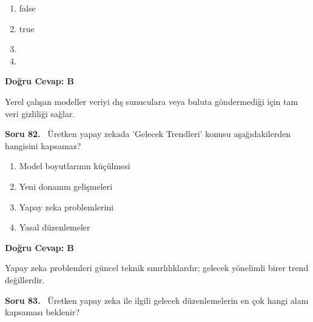 \documentclass[11pt,a4paper,openany]{book}
\begin{document}
\begin{enumerate}[label=\Alph*), leftmargin=25pt, topsep=4pt, itemsep=2pt]
        \item false
        \item true
        \item 
        \item 
\end{enumerate}

\vspace{4pt}
\begin{tcolorbox}[title=Cevap ve Açıklama, colback=gray!3!white, colframe=primarycolor!90!black, arc=2mm, fonttitle=\bfseries\sffamily, top=6pt, bottom=6pt]
    \textbf{Doğru Cevap: B}

    \vspace{2pt}
    Yerel çalışan modeller veriyi dış sunuculara veya buluta göndermediği için tam veri gizliliği sağlar.
\end{tcolorbox}
\vspace{10pt}
\needspace{5cm}
\vspace{8pt}
\noindent\textbf{\large\sffamily Soru 82.} \ Üretken yapay zekada 'Gelecek Trendleri' konusu aşağıdakilerden hangisini kapsamaz?

\begin{enumerate}[label=\Alph*), leftmargin=25pt, topsep=4pt, itemsep=2pt]
        \item Model boyutlarının küçülmesi
        \item Yeni donanım gelişmeleri
        \item Yapay zeka problemlerini
        \item Yasal düzenlemeler
\end{enumerate}

\vspace{4pt}
\begin{tcolorbox}[title=Cevap ve Açıklama, colback=gray!3!white, colframe=primarycolor!90!black, arc=2mm, fonttitle=\bfseries\sffamily, top=6pt, bottom=6pt]
    \textbf{Doğru Cevap: B}

    \vspace{2pt}
    Yapay zeka problemleri güncel teknik sınırlılıklardır; gelecek yönelimli birer trend değillerdir.
\end{tcolorbox}
\vspace{10pt}
\needspace{5cm}
\vspace{8pt}
\noindent\textbf{\large\sffamily Soru 83.} \ Üretken yapay zeka ile ilgili gelecek düzenlemelerin en çok hangi alanı kapsaması beklenir?
\end{document}
